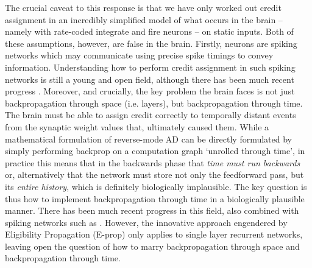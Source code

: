 The crucial caveat to this response is that we have only worked out credit assignment in an incredibly simplified model of what occurs in the brain -- namely with rate-coded integrate and fire neurons -- on static inputs. Both of these assumptions, however, are false in the brain. Firstly, neurons are spiking networks which may communicate using precise spike timings to convey information. Understanding how to perform credit assignment in such spiking networks is still a young and open field, although there has been much recent progress \citep{schiess2016somato,zenke2018superspike,kaiser2020synaptic,neftci2019surrogate}. Moreover, and crucially, the key problem the brain faces is not just backpropagation through space (i.e. layers), but backpropagation through time. The brain must be able to assign credit correctly to temporally distant events from the synaptic weight values that, ultimately caused them. While a mathematical formulation of reverse-mode AD can be directly formulated by simply performing backprop on a computation graph `unrolled through time', in practice this means that in the backwards phase that \emph{time must run backwards} or, alternatively that the network must store not only the feedforward pass, but its \emph{entire history}, which is definitely biologically implausible. The key question is thus how to implement backpropagation through time in a biologically plausible manner. There has been much recent progress in this field, also combined with spiking networks such as \citep{zenke2018superspike,bellec2020solution}. However, the innovative approach engendered by Eligibility Propagation (E-prop) only applies to single layer recurrent networks, leaving open the question of how to marry backpropagation through space and backpropagation through time.

